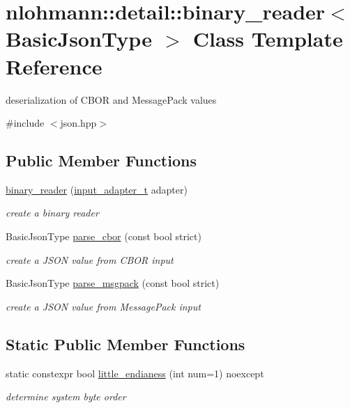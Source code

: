 \hypertarget{classnlohmann_1_1detail_1_1binary__reader}{}\section{nlohmann\+:\+:detail\+:\+:binary\+\_\+reader$<$ Basic\+Json\+Type $>$ Class Template Reference}
\label{classnlohmann_1_1detail_1_1binary__reader}


deserialization of C\+B\+OR and Message\+Pack values  




{\ttfamily \#include $<$json.\+hpp$>$}

\subsection*{Public Member Functions}
\begin{DoxyCompactItemize}
\item 
\hyperlink{classnlohmann_1_1detail_1_1binary__reader_a7e643baadaf4c31718cd74833bdd542f}{binary\+\_\+reader} (\hyperlink{namespacenlohmann_1_1detail_ae132f8cd5bb24c5e9b40ad0eafedf1c2}{input\+\_\+adapter\+\_\+t} adapter)
\begin{DoxyCompactList}\small\item\em create a binary reader \end{DoxyCompactList}\item 
Basic\+Json\+Type \hyperlink{classnlohmann_1_1detail_1_1binary__reader_a04bcdc8f55b26fafa9775a2f89e48fc2}{parse\+\_\+cbor} (const bool strict)
\begin{DoxyCompactList}\small\item\em create a J\+S\+ON value from C\+B\+OR input \end{DoxyCompactList}\item 
Basic\+Json\+Type \hyperlink{classnlohmann_1_1detail_1_1binary__reader_ab4a4a6f5ab3cc77aac374c9c889e580e}{parse\+\_\+msgpack} (const bool strict)
\begin{DoxyCompactList}\small\item\em create a J\+S\+ON value from Message\+Pack input \end{DoxyCompactList}\end{DoxyCompactItemize}
\subsection*{Static Public Member Functions}
\begin{DoxyCompactItemize}
\item 
static constexpr bool \hyperlink{classnlohmann_1_1detail_1_1binary__reader_a1d8f70f95d241354f86a0b9ae711c1c3}{little\+\_\+endianess} (int num=1) noexcept
\begin{DoxyCompactList}\small\item\em determine system byte order \end{DoxyCompactList}\end{DoxyCompactItemize}


